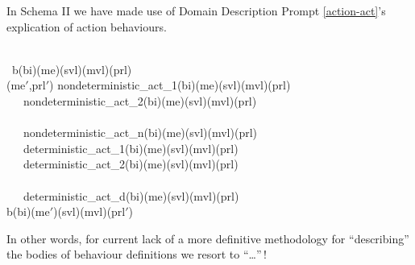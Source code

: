 
\begynd
\pind In Schema II
\begynd
\pind we have made use of \textsf{Domain Description Prompt} \ref{action-act}'s 
\pind explication of action behaviours.
\afslut
\afslut
\afslut


\bp
{}\\
\>\ b(bi)(me)(svl)(mvl)(prl) {\IS}\\
\>\>\> (me$'$,prl$'$) {\EQ} non{\MINUS}deterministic\_act\_1(bi)(me)(svl)(mvl)(prl)\\
\>\>\>\>\>\>\>\,\ \ {\NONDETCHOICE} non{\MINUS}deterministic\_act\_2(bi)(me)(svl)(mvl)(prl)\\
\>\>\>\>\>\>\>\,\ \ {\DOTDOTDOT}\\
\>\>\>\>\>\>\>\,\ \ {\NONDETCHOICE} non{\MINUS}deterministic\_act\_n(bi)(me)(svl)(mvl)(prl)\\
\>\>\>\>\>\>\>\,\ \ {\DETCHOICE} deterministic\_act\_1(bi)(me)(svl)(mvl)(prl)\\
\>\>\>\>\>\>\>\,\ \ {\DETCHOICE} deterministic\_act\_2(bi)(me)(svl)(mvl)(prl)\\
\>\>\>\>\>\>\>\,\ \ {\DOTDOTDOT}\\
\>\>\>\>\>\>\>\,\ \ {\DETCHOICE} deterministic\_act\_d(bi)(me)(svl)(mvl)(prl) \\
\>\>\>b(bi)(me$'$)(svl)(mvl)(prl$'$) \ \ \ 
\ep



\HHHH\label{Describe Behaviour Definition Bodies}

\begynd
\pind In other words, 
\begynd
\pind for current lack of a more definitive methodology
\pind for ``describing'' the bodies of behaviour definitions
\pind we resort to ``\ldots''\,!
\afslut
\afslut

